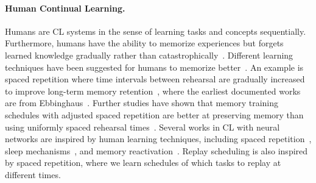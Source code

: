 \paragraph{Human Continual Learning.} Humans are CL systems in the sense of learning tasks and concepts sequentially. Furthermore, humans have the ability to memorize experiences but forgets learned knowledge gradually rather than catastrophically~. Different learning techniques have been suggested for humans to memorize better~. 
An example is spaced repetition where time intervals between rehearsal are gradually increased to improve long-term memory retention~, where the earliest documented works are from Ebbinghaus~. %
Further studies have shown that memory training schedules with adjusted spaced repetition are better at preserving memory than using uniformly spaced rehearsal times~. 
Several works in CL with neural networks are inspired by %
human learning techniques, including spaced repetition~, %
sleep mechanisms~, %
and memory reactivation~. %
Replay scheduling is also inspired by spaced repetition, where %
we learn schedules of which tasks to replay at different times. %


